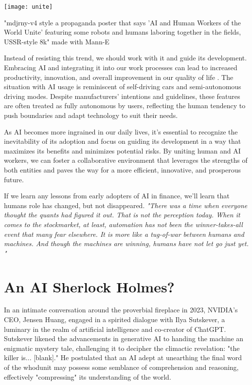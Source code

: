 \begin{pdf}
\begin{marginfigure}[-5.5cm]
    \texttt{[image: unite]}
        \caption{"mdjrny-v4 style a propaganda poster that says 'AI and Human Workers of the World Unite' featuring some robots and humans laboring together in the fields, USSR-style 8k" made with Mann-E}
\end{marginfigure}
\end{pdf}

Instead of resisting this trend, we should work with it and guide its development. Embracing AI and integrating it into our work processes can lead to increased productivity, innovation, and overall improvement in our quality of life . The situation with AI usage is reminiscent of self-driving cars and semi-autonomous driving modes. Despite manufacturers’ intentions and guidelines, these features are often treated as fully autonomous by users, reflecting the human tendency to push boundaries and adapt technology to suit their needs.

As AI becomes more ingrained in our daily lives, it’s essential to recognize the inevitability of its adoption and focus on guiding its development in a way that maximizes its benefits and minimizes potential risks. By uniting human and AI workers, we can foster a collaborative environment that leverages the strengths of both entities and paves the way for a more efficient, innovative, and prosperous future.

If we learn any lessons from early adopters of AI in finance, we'll learn that humans role has changed, but not disappeared. \textit{"There was a time when everyone thought the quants had figured it out. That is not the perception today. When it comes to the stockmarket, at least, automation has not been the winner-takes-all event that many fear elsewhere. It is more like a tug-of-war between humans and machines. And though the machines are winning, humans have not let go just yet. "} 

\section {An AI Sherlock Holmes?}

In an intimate conversation around the proverbial fireplace in 2023, NVIDIA’s CEO, Jensen Huang, engaged in a spirited dialogue with Ilya Sutskever, a luminary in the realm of artificial intelligence and co-creator of ChatGPT. Sutskever likened the advancements in generative AI to handing the machine an enigmatic mystery tale, challenging it to decipher the climactic revelation: "the killer is... [blank]." He postulated that an AI adept at unearthing the final word of the whodunit may possess some semblance of comprehension and reasoning, effectively "compressing" its understanding of the world.

